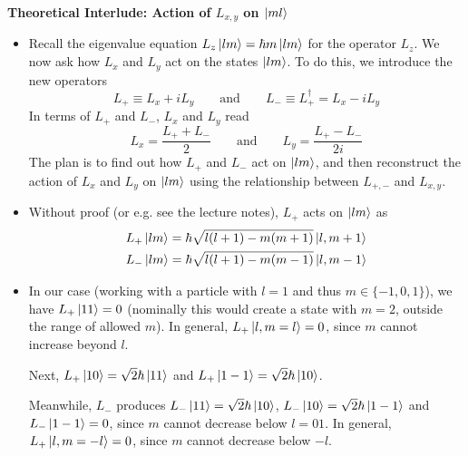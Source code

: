 \documentclass[11pt, a4paper]{article}
\newcommand{\eqtext}[1]{\qquad \text{#1} \qquad}
\begin{document}
\textbf{Theoretical Interlude: Action of $ L_{x, y} $ on $ \ket{ml} $}
\begin{itemize}
	\item Recall the eigenvalue equation $ L_{z} \ket{lm} = \hbar m \ket{lm} $ for the operator $ L_{z} $. We now ask how $ L_{x} $ and $ L_{y} $ act on the states $ \ket{lm} $. To do this, we introduce the new operators
	\begin{equation*}
		L_{+} \equiv L_{x} + i L_{y} \eqtext{and} L_{-} \equiv L_{+}^{\dagger} = L_{x} - i L_{y}
	\end{equation*}
	In terms of $ L_{+} $ and $ L_{-} $, $ L_{x} $ and $ L_{y} $ read
	\begin{equation*}
		L_{x} = \frac{L_{+} + L_{-}}{2} \eqtext{and} L_{y} = \frac{L_{+} - L_{-}}{2i}
	\end{equation*}
	The plan is to find out how $ L_{+} $ and $ L_{-} $ act on $ \ket{lm} $, and then reconstruct the action of $ L_{x} $ and $ L_{y} $ on $ \ket{lm} $ using the relationship between $ L_{+, -} $ and $ L_{x, y} $. 
	
	\item Without proof (or e.g. see the lecture notes), $ L_{+} $ acts on $ \ket{lm} $ as
	\begin{align*}
		&L_{+}\ket{lm} = \hbar \sqrt{l (l+1) - m(m+1)} \ket{l, m+1} \\
		&L_{-}\ket{lm} = \hbar \sqrt{l (l+1) - m(m-1)} \ket{l, m-1} 
	\end{align*}
	
	\item In our case (working with a particle with $ l = 1 $ and thus $ m \in \{-1, 0, 1\} $), we have $ L_{+}\ket{11} = 0 $ (nominally this would create a state with $ m = 2 $, outside the range of allowed $ m $). In general, $ L_{+}\ket{l, m=l} = 0 $, since $ m $  cannot increase beyond $ l $. 
	
	Next, $ L_{+}\ket{10} = \sqrt{2}\hbar \ket{11} $ and $ L_{+}\ket{1 -1} = \sqrt{2}\hbar \ket{10} $.
	
	Meanwhile, $ L_{-} $ produces $ L_{-}\ket{11} = \sqrt{2}\hbar \ket{10} $, $ L_{-}\ket{10} = \sqrt{2}\hbar \ket{1-1} $ and $ L_{-}\ket{1-1} = 0 $, since $ m $ cannot decrease below $ l = 01 $. In general, $ L_{+}\ket{l, m=-l} = 0 $, since $ m $  cannot decrease below $ -l $. 
	
\end{itemize}
\end{document}
